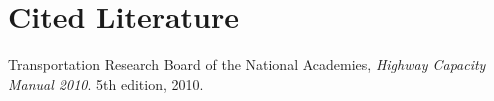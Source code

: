 \documentclass{report}
\begin{document}
\noindent
\section*{Cited Literature}

\begin{thebibliography}{9}
    Transportation Research Board of the National Academies,
    \emph{Highway Capacity Manual 2010}.
    5th edition,
    2010.
  \bibitem{}
\end{thebibliography}
\end{document}
